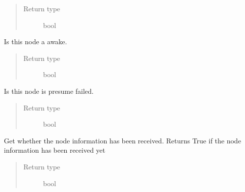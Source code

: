 \documentclass[letterpaper,10pt,english]{sphinxmanual}
\begin{document}
\begin{fulllineitems}
\begin{fulllineitems}
\begin{quote}
\begin{description}
\item[{Return type}] \leavevmode
bool

\end{description}\end{quote}

\end{fulllineitems}


\begin{fulllineitems}
\label{node:openzwave.node.ZWaveNode.isNodeAwake}
Is this node a awake.
\begin{quote}\begin{description}
\item[{Return type}] \leavevmode
bool

\end{description}\end{quote}

\end{fulllineitems}


\begin{fulllineitems}
\label{node:openzwave.node.ZWaveNode.isNodeFailed}
Is this node is presume failed.
\begin{quote}\begin{description}
\item[{Return type}] \leavevmode
bool

\end{description}\end{quote}

\end{fulllineitems}


\begin{fulllineitems}
\label{node:openzwave.node.ZWaveNode.isNodeInfoReceived}
Get whether the node information has been received. Returns True if the node information has been received yet
\begin{quote}\begin{description}
\item[{Return type}] \leavevmode
bool

\end{description}\end{quote}


\end{fulllineitems}
\end{fulllineitems}
\end{document}
